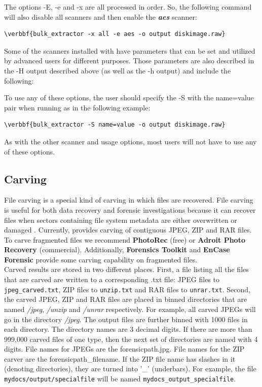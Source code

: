 \documentclass[11pt]{article} %
\begin{document}
The options -E, -e and -x are all processed in order. So, the following command will also disable all scanners and then enable the \textbf{\textit{aes}} scanner: 
\begin{Verbatim}[commandchars=\\\{\}]
\verbbf{bulk_extractor -x all -e aes -o output diskimage.raw}
\end{Verbatim} 

Some of the scanners installed with \bulk have parameters that can be set and utilized by advanced users for different purposes. Those parameters are also described in the -H output described above (as well as the -h output) and include the following:
\begingroup
\footnotesize
{
\selectfont

}
\endgroup

To use any of these options, the user should specify the -S with the name=value pair when running \bulk as in the following example:
\begin{Verbatim}[commandchars=\\\{\}]
\verbbf{bulk_extractor -S name=value -o output diskimage.raw}
\end{Verbatim} 
As with the other scanner and \bulk usage options, most users will not have to use any of these options. 

\subsection{Carving}
\label{carving}

File carving is a special kind of carving in which files are recovered. File carving is useful for both data recovery and forensic investigations because it can recover files when sectors containing file system metadata are either overwritten or damaged \cite{digitalmediatriage}. Currently, \bulk provides carving of contiguous JPEG, ZIP and RAR files. To carve fragmented files we recommend \textbf{PhotoRec} (free) or \textbf{Adroit Photo Recovery} (commercial). Additionally, \textbf{Forensics Toolkit} and \textbf{EnCase Forensic} provide some carving capability on fragmented files.\\

Carved results are stored in two different places. First, a file listing all the files that are carved are written to a corresponding .txt file: JPEG files to \texttt{jpeg\_carved.txt}, ZIP files to \texttt{unzip.txt} and RAR files to \texttt{unrar.txt}. Second, the carved JPEG, ZIP and RAR files are placed in binned directories that are named \textit{/jpeg}, \textit{/unzip} and \textit{/unrar} respectively. For example, all carved JPEGs will go in the directory \textit{/jpeg}. The output files are further binned with 1000 files in each directory. The directory names are 3 decimal digits. If there are more than 999,000 carved files of one type, then the next set of directories are named with 4 digits. File names for JPEGs are the forensicpath.jpg. File names for the ZIP carver are the forensicpath\_filename. If the ZIP file name has slashes in it (denoting directories), they are turned into '\_' (underbars). For example, the file \texttt{mydocs/output/specialfile} will be named \texttt{mydocs\_output\_specialfile}. \\
\end{document}
